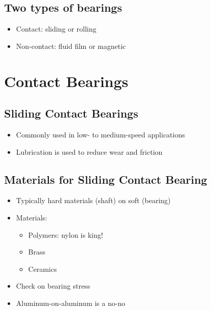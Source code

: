 \documentclass[
10pt,
a4paper,
openany,
svgnames,
]{book}
\begin{document}
\subsection*{Two types of bearings}
\label{sec:org98f6af3}

\begin{itemize}
\item Contact: sliding or rolling

\item Non-contact: fluid film or magnetic
\end{itemize}

\section*{Contact Bearings}
\label{sec:org1d69975}

\subsection*{Sliding Contact Bearings}
\label{sec:orgd75a2e1}

\begin{itemize}
\item Commonly used in low- to medium-speed applications
\end{itemize}

\begin{center}
\end{center}

\begin{itemize}
\item Lubrication is used to reduce wear and friction
\end{itemize}

\subsection*{Materials for Sliding Contact Bearing}
\label{sec:org6549bb0}

\begin{itemize}
\item Typically hard materials (shaft) on soft (bearing)
\item Materials:
\begin{itemize}
\item Polymers: nylon is king!
\item Brass
\item Ceramics
\end{itemize}
\item Check on bearing stress
\item Aluminum-on-aluminum is a no-no
\end{itemize}
\end{document}
